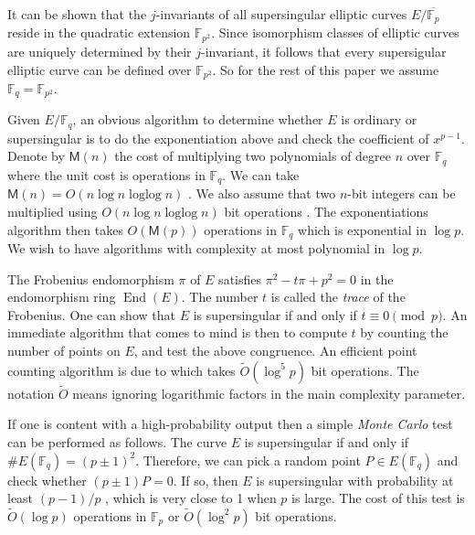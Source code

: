 \documentclass[12pt]{article}
\theoremstyle{plain}
\theoremstyle{definition}
\newcommand{\tildO}{\tilde{O}}
\DeclareMathOperator{\ringofend}{End} %
\DeclareMathOperator{\loglog}{loglog}
\def\F{\ensuremath{\mathbb{F}}}
\def\MM{\ensuremath{\mathsf{M}}}
\begin{document}
It can be shown that the $j$-invariants of all supersingular elliptic curves $E / \overline{\F_p}$ 
reside in the quadratic extension $\F_{p^2}$. Since isomorphism classes of elliptic curves are 
uniquely determined by their $j$-invariant, it follows that every supersigular elliptic curve can 
be defined over $\F_{p^2}$. So for the rest of this paper we assume $\F_q = \F_{p^2}$. 

Given $E / \F_q$, an obvious algorithm to determine whether $E$ is ordinary or supersingular is to 
do the exponentiation above and check the coefficient of $x^{p - 1}$. Denote by $\MM(n)$ the cost 
of multiplying two polynomials of degree $n$ over $\F_q$ where the unit cost is operations in 
$\F_q$. We can take $\MM(n) = O(n\log n \loglog n)$ \cite{vzGG}. We also assume that two $n$-bit 
integers can be multiplied using $O(n\log n \loglog n)$ bit operations \cite{vzGG}. The 
exponentiations algorithm then takes $O(\MM(p))$ operations in $\F_q$ which is exponential in $\log 
p$. We wish to have algorithms with complexity at most polynomial in $\log p$.

The Frobenius endomorphism $\pi$ of $E$ satisfies $\pi^2 - t\pi + p^2 = 0$ in the endomorphism ring 
$\ringofend(E)$. The number $t$ is called the \textit{trace} of the Frobenius. One can show that 
$E$ is supersingular if and only if $t \equiv 0 \pmod{p}$. An immediate algorithm that comes to 
mind is then to compute $t$ by counting the number of points on $E$, and test the above congruence. 
An efficient point counting algorithm is due to \cite{schoof85} which takes $\tildO(\log^5 p)$ bit 
operations. The notation $\tildO$ means ignoring logarithmic factors in the main complexity 
parameter.

If one is content with a high-probability output then a simple \textit{Monte Carlo} test can be 
performed as follows. The curve $E$ is supersingular if and only if $\#E(\F_q) = (p \pm 1)^2$. 
Therefore, we can pick a random point $P \in E(\F_q)$ and check whether $(p \pm 1)P = 0$. If so, 
then $E$ is supersingular with probability at least $(p - 1) / p$ \cite[Prop. 2]{sutherland2012}, 
which is very close to 1 when $p$ is large. The cost of this test is $\tildO(\log p)$ operations in 
$\F_p$ or $\tildO(\log^2 p)$ bit operations.
\end{document}
